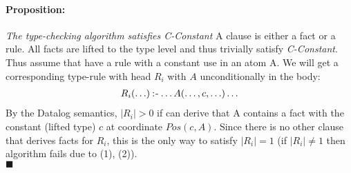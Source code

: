 \paragraph{Proposition: } \textit{The type-checking algorithm satisfies C-Constant}\NL
A clause is either a fact or a rule. All facts are lifted to the type level and thus trivially satisfy \textit{C-Constant}. Thus assume that have a rule with a constant use in an atom A. We will get a corresponding type-rule with head $R_i$ with $A$ unconditionally in the body:
\begin{align*}
R_i(\ldots) \mathbin{:\hspace{-0.5ex}\textsf{-}} \ldots A(\ldots, c, \ldots) \ldots
\end{align*}
By the Datalog semantics, $|R_i| > 0$ if can derive that A contains a fact with the constant (lifted type) $c$ at coordinate $Pos(c, A)$. Since there is no other clause that derives facts for $R_i$, this is the only way to satisfy $|R_i| = 1$ (if $|R_i| \neq 1$ then algorithm fails due to (1), (2)).\\\hspace*{200pt}$\blacksquare$

